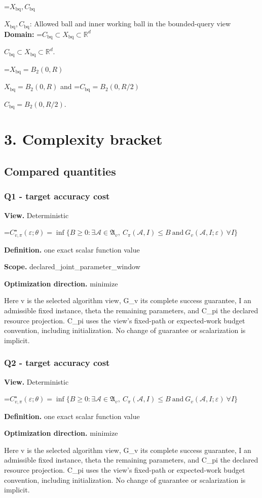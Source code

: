 \documentclass[10pt,a4paper]{article}
\newcommand{\AtlasMath}[1]{\par\begingroup\centering\setbox0=\hbox{$\displaystyle #1$}\ifdim\wd0>1.4\linewidth\typeout{ATLAS WIDE FORMULA: \the\wd0}\fi\ifdim\wd0>\linewidth\resizebox{\linewidth}{!}{\box0}\else\box0\fi\par\endgroup}
\newcommand{\AtlasInlineMath}[1]{\begingroup\setbox0=\hbox{$#1$}\ifdim\wd0>.4\linewidth\endgroup\AtlasMath{#1}\else\endgroup$#1$\fi}
\begin{document}
\AtlasInlineMath{X_{\mathrm{bq}},C_{\mathrm{bq}}}: Allowed ball and inner working ball in the bounded-query view \textbf{Domain:} \AtlasInlineMath{C_{\mathrm{bq}}\subset X_{\mathrm{bq}}\subset\mathbb R^d}.

\AtlasInlineMath{X_{\mathrm{bq}}=B_2(0,R)} and \AtlasInlineMath{C_{\mathrm{bq}}=B_2(0,R/2)}.

\section{3. Complexity bracket}
\subsection{Compared quantities}
\subsubsection{Q1 - target accuracy cost}
\textbf{View.} Deterministic

\AtlasMath{C^\star_{v,\pi}(\varepsilon;\theta)=\inf\{B\ge0:\exists\mathcal A\in\mathfrak A_v,\ C_\pi(\mathcal A,I)\le B\ \text{and}\ G_v(\mathcal A,I;\varepsilon)\ \forall I\}}
\textbf{Definition.} one exact scalar function value

\textbf{Scope.} declared\_joint\_parameter\_window

\textbf{Optimization direction.} minimize

Here v is the selected algorithm view, G\_v its complete success guarantee, I an admissible fixed instance, theta the remaining parameters, and C\_pi the declared resource projection. C\_pi uses the view's fixed-path or expected-work budget convention, including initialization. No change of guarantee or scalarization is implicit.

\subsubsection{Q2 - target accuracy cost}
\textbf{View.} Deterministic

\AtlasMath{C^\star_{v,\pi}(\varepsilon;\theta)=\inf\{B\ge0:\exists\mathcal A\in\mathfrak A_v,\ C_\pi(\mathcal A,I)\le B\ \text{and}\ G_v(\mathcal A,I;\varepsilon)\ \forall I\}}
\textbf{Definition.} one exact scalar function value

\textbf{Optimization direction.} minimize

Here v is the selected algorithm view, G\_v its complete success guarantee, I an admissible fixed instance, theta the remaining parameters, and C\_pi the declared resource projection. C\_pi uses the view's fixed-path or expected-work budget convention, including initialization. No change of guarantee or scalarization is implicit.
\end{document}
